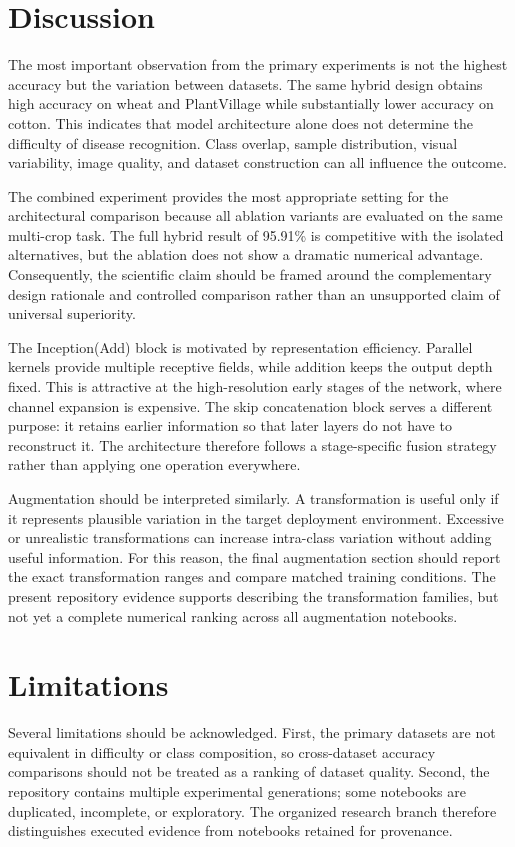 \documentclass[a4paper,fleqn]{cas-dc}
\begin{document}
\section{Discussion}
The most important observation from the primary experiments is not the highest accuracy but the variation between datasets. The same hybrid design obtains high accuracy on wheat and PlantVillage while substantially lower accuracy on cotton. This indicates that model architecture alone does not determine the difficulty of disease recognition. Class overlap, sample distribution, visual variability, image quality, and dataset construction can all influence the outcome.

The combined experiment provides the most appropriate setting for the architectural comparison because all ablation variants are evaluated on the same multi-crop task. The full hybrid result of 95.91\% is competitive with the isolated alternatives, but the ablation does not show a dramatic numerical advantage. Consequently, the scientific claim should be framed around the complementary design rationale and controlled comparison rather than an unsupported claim of universal superiority.

The Inception(Add) block is motivated by representation efficiency. Parallel kernels provide multiple receptive fields, while addition keeps the output depth fixed. This is attractive at the high-resolution early stages of the network, where channel expansion is expensive. The skip concatenation block serves a different purpose: it retains earlier information so that later layers do not have to reconstruct it. The architecture therefore follows a stage-specific fusion strategy rather than applying one operation everywhere.

Augmentation should be interpreted similarly. A transformation is useful only if it represents plausible variation in the target deployment environment. Excessive or unrealistic transformations can increase intra-class variation without adding useful information. For this reason, the final augmentation section should report the exact transformation ranges and compare matched training conditions. The present repository evidence supports describing the transformation families, but not yet a complete numerical ranking across all augmentation notebooks.

\section{Limitations}
Several limitations should be acknowledged. First, the primary datasets are not equivalent in difficulty or class composition, so cross-dataset accuracy comparisons should not be treated as a ranking of dataset quality. Second, the repository contains multiple experimental generations; some notebooks are duplicated, incomplete, or exploratory. The organized research branch therefore distinguishes executed evidence from notebooks retained for provenance.
\end{document}

